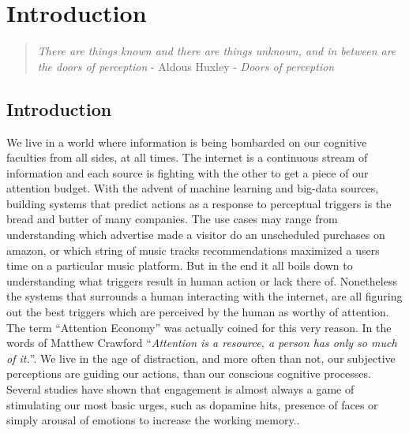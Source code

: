 
\chapter{Introduction}  %

\graphicspath{{Chapter1/Figures/} {Chapter1/Figures}}
\begin{quote}
\textsl{There are things known and there are things unknown, and in between are the doors of perception} - Aldous Huxley - \textsl{Doors of perception}
\end{quote}


\section{Introduction}

We live in a world where information is being bombarded on our cognitive faculties from all sides, at all times. The internet is a continuous stream of information and each source is fighting with the other to get a piece of our attention budget. 
With the advent of machine learning and big-data sources, building systems that predict actions as a response to perceptual triggers is the bread and butter of many companies. The use cases may range from understanding which advertise made a visitor do an unscheduled purchases on amazon, or which string of music tracks recommendations maximized a users time on a particular music platform. But in the end it all boils down to understanding what triggers result in human action or lack there of\cite{song2012survey}. Nonetheless the systems that surrounds a human interacting with the internet, are all figuring out the best triggers which are perceived by the human as worthy of attention. 
The term ``Attention Economy''\cite{davenport2001attention} was actually coined for this very reason. In the words of Matthew Crawford ``\textit{Attention is a resource, a person has only so much of it.}''\cite{MatthewCrawford}. We live in the age of distraction, and more often than not, our subjective perceptions are guiding our actions, than our conscious cognitive processes. Several studies have shown that engagement is almost always a game of stimulating our most basic urges, such as dopamine hits, presence of faces or simply arousal of emotions to increase the working memory.\cite{bakhshi2014faces,joglekar2017like}\cite{schupp2006emotion}\cite{soat2015social}. 


